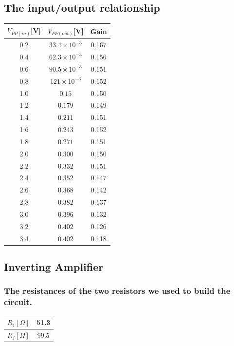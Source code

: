 \documentclass[12pt]{article}
\begin{document}
\subsection{The input/output relationship}
\begin{table}[H]
\centering
\begin{tabular}{|c|c|c|}
\hline
$V_{PP(in)}$[V]    &$V_{PP(out)}$[V] &Gain   \\ \hline
0.2 &$33.4\times 10^{-3}$&0.167  \\ \hline
0.4 &$62.3\times 10^{-3}$&0.156  \\ \hline
0.6 &$90.5\times 10^{-3}$&0.151  \\ \hline
0.8 &$121\times 10^{-3}$&0.152  \\ \hline
1.0 &$0.15$&0.150  \\ \hline
1.2 &$0.179$&0.149  \\ \hline
1.4 &$0.211$&0.151  \\ \hline
1.6 &$0.243$&0.152  \\ \hline
1.8 &$0.271$&0.151  \\ \hline
2.0 &$0.300$&0.150 \\ \hline
2.2 &$0.332$&0.151  \\ \hline
2.4 &$0.352$&0.147  \\ \hline
2.6 &$0.368$&0.142  \\ \hline
2.8 &$0.382$&0.137  \\ \hline
3.0 &$0.396$&0.132  \\ \hline
3.2 &$0.402$&0.126  \\ \hline
3.4 &$0.402$&0.118	  \\ \hline
\end{tabular}
\end{table}
\subsection{Inverting Amplifier}
\subsubsection{The resistances of the two resistors we used to build the circuit.}
\begin{table}[H]
\centering
\begin{tabular}{|c|c|}
\hline
$R_1[\Omega]$        &51.3      \\ \hline
$R_f[\Omega]$        &99.5    \\ \hline
\end{tabular}
\end{table}
\end{document}

